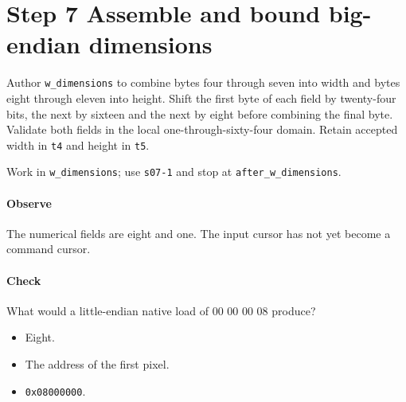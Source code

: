 \section{Step 7 Assemble and bound big-endian dimensions}\label{qoi-s07}
Author \texttt{w\_dimensions} to combine bytes four through seven into width and bytes eight through eleven into height. Shift the first byte of each field by twenty-four bits, the next by sixteen and the next by eight before combining the final byte. Validate both fields in the local one-through-sixty-four domain. Retain accepted width in \texttt{t4} and height in \texttt{t5}.

Work in \texttt{w\_dimensions}; use \texttt{s07-1} and stop at \texttt{after\_w\_dimensions}.

\paragraph{Observe} The numerical fields are eight and one. The input cursor has not yet become a command cursor.

\paragraph{Check} What would a little-endian native load of 00 00 00 08 produce?
\begin{itemize}
  \item[A.] Eight.
  \item[B.] The address of the first pixel.
  \item[C.] \texttt{0x08000000}.
\end{itemize}
